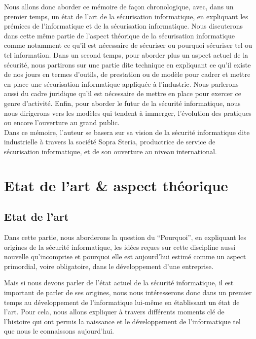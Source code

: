 \documentclass[a4paper]{memoir}
\begin{document}
Nous allons donc aborder ce mémoire de façon chronologique, avec, dans un premier temps, un état de l'art de la sécurisation informatique, en expliquant les prémices de l'informatique et de la sécurisation informatique. Nous discuterons dans cette même partie de l'aspect théorique de la sécurisation informatique comme notamment ce qu'il est nécessaire de sécuriser ou pourquoi sécuriser tel ou tel information.
Dans un second temps, pour aborder plus un aspect actuel de la sécurité, nous partirons sur une partie dite technique en expliquant ce qu'il existe de nos jours en termes d'outils, de prestation ou de modèle pour cadrer et mettre en place une sécurisation informatique appliquée à l'industrie. Nous parlerons aussi du cadre juridique qu'il est nécessaire de mettre en place pour exercer ce genre d'activité. Enfin, pour aborder le futur de la sécurité informatique, nous nous dirigerons vers les modèles qui tendent à immerger, l'évolution des pratiques ou encore l'ouverture au grand public.\\

Dans ce mémoire, l'auteur se basera sur sa vision de la sécurité informatique dite industrielle à travers la société Sopra Steria, productrice de service de sécurisation informatique, et de son ouverture au niveau international.




\part{Etat de l'art \& aspect théorique}


\chapter{Etat de l'art}%

Dans cette partie, nous aborderons la question du ``Pourquoi'', en expliquant les origines de la sécurité informatique, les idées reçues sur cette discipline aussi nouvelle qu'incomprise et pourquoi elle est aujourd'hui estimé comme un aspect primordial, voire obligatoire, dans le développement d'une entreprise.

\noindent Mais si nous devons parler de l'état actuel de la sécurité informatique, il est important de parler de ses origines, nous nous intéresserons donc dans un premier temps au développement de l'informatique lui-même en établissant un état de l'art. Pour cela, nous allons expliquer à travers différents moments clé de l'histoire qui ont permis la naissance et le développement de l'informatique tel que nous le connaissons aujourd'hui.\\
\end{document}
